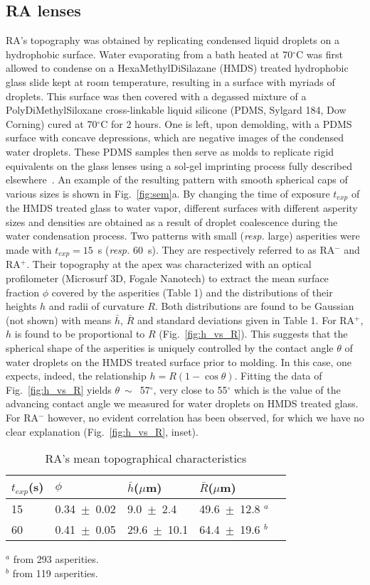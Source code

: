 \documentclass[pre,groupedaddress,showkeys,showpacs,twocolumn]{revtex4}
\begin{document}
\subsection*{RA lenses}
RA's topography was obtained by replicating condensed liquid droplets on a hydrophobic surface. Water evaporating from a bath heated at 70$^\circ$C  was first allowed to condense on a HexaMethylDiSilazane (HMDS) treated hydrophobic glass slide kept at room temperature, resulting in a surface with myriads of droplets. This surface was then covered with a degassed mixture of a PolyDiMethylSiloxane cross-linkable liquid silicone (PDMS, Sylgard 184, Dow Corning) cured at 70$^\circ$C for 2 hours. One is left, upon demolding, with a PDMS surface with concave depressions, which are negative images of the condensed water droplets. These PDMS samples then serve as molds to replicate rigid equivalents on the glass lenses using a sol-gel imprinting process fully described elsewhere~\cite{letailleur2010}. An example of the resulting pattern with smooth spherical caps of various sizes is shown in Fig.~\ref{fig:sem}a. By changing the time of exposure $t_{exp}$ of the HMDS treated glass to water vapor, different surfaces 
with different asperity sizes and densities are obtained as a result of droplet coalescence during the water condensation process. Two patterns with small (\textit{resp.} large) asperities were made with $t_{exp}=15$~s (\textit{resp.}  60~s). They are respectively referred to as RA$^-$ and RA$^+$. Their topography at the apex was characterized with an optical profilometer (Microsurf 3D, Fogale Nanotech) to extract the mean surface fraction $\phi$ covered by the asperities (Table 1) and the distributions of their heights $h$ and radii of curvature $R$. Both distributions are found to be Gaussian (not shown) with means $\bar h$, $\bar R$ and standard deviations given in Table 1. For RA$^+$, $h$ is found to be proportional to $R$ (Fig.~\ref{fig:h_vs_R}). This suggests that the spherical shape of the asperities is uniquely controlled by the contact angle $\theta$ of water droplets on the HMDS treated surface prior to molding. In this case, one expects, indeed, the relationship $h=R(1-\cos \theta)$. Fitting the 
data of Fig.~\ref{fig:h_vs_R} yields $\theta~\sim$~57$^\circ$, very close to 55$^\circ$ which is the value of the advancing contact angle we measured for water droplets on HMDS treated glass. For RA$^-$ however, no evident correlation has been observed, for which we have no clear explanation (Fig.~\ref{fig:h_vs_R}, inset).\\
%
\begin{table}[ht]
	\caption{\label{tab:table1}
		RA's mean topographical characteristics}
	\begin{tabular*}{0.48\textwidth}{@{\extracolsep{\fill}}lllll}
		\hline
		$t_{exp}$(s)&$\phi$&$\bar h$($\mu$m)&$\bar R$($\mu$m)\\
		\hline
		\hline
		15 & 0.34~$\pm$~0.02 & 9.0~$\pm$~2.4 & 49.6~$\pm$~12.8 $^{a}$ \\
		60 & 0.41~$\pm$~0.05 & 29.6~$\pm$~10.1 & 64.4~$\pm$~19.6 $^{b}$ \\
		\hline
	\end{tabular*}
	$^{a}$ from 293 asperities. \\
	$^{b}$ from 119 asperities.
\end{table}
\end{document}
